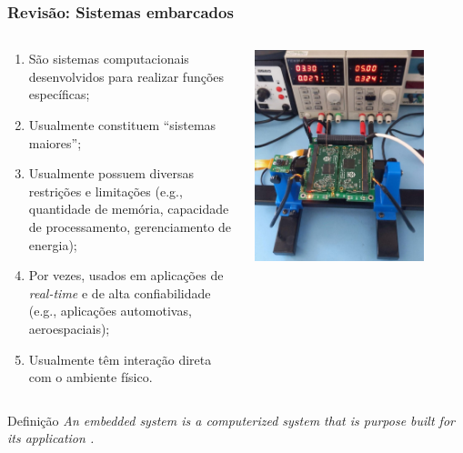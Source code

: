 \documentclass{beamer}
\begin{document}
\begin{frame}[fragile]
\frametitle{Revisão: Sistemas embarcados}

\begin{columns}
    \begin{column}{0.6\textwidth}
        \begin{enumerate}\footnotesize
            \item São sistemas computacionais desenvolvidos para realizar funções específicas;
            \item Usualmente constituem ``sistemas maiores'';
            \item Usualmente possuem diversas restrições e limitações (e.g., quantidade de memória, capacidade de processamento, gerenciamento de energia);
            \item Por vezes, usados em aplicações de \textit{real-time} e de alta confiabilidade (e.g., aplicações automotivas, aeroespaciais);
            \item Usualmente têm interação direta com o ambiente físico.
        \end{enumerate}
    \end{column}
    
    \begin{column}{0.4\textwidth}
        \begin{center}
            \includegraphics[width=0.8\textwidth]{../figures/cubesat_obc_rasp.jpeg}
        \end{center}
    \end{column}
\end{columns}

\vfill
\begin{block}{Definição}
    \textit{An embedded system is a computerized system that is purpose built for its application \cite{white_2024}.}
\end{block}
\end{frame}
\end{document}
